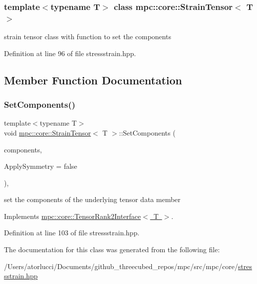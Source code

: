 \subsubsection*{template$<$typename T$>$\newline
class mpc\+::core\+::\+Strain\+Tensor$<$ T $>$}

strain tensor class with function to set the components 

Definition at line 96 of file stressstrain.\+hpp.



\subsection{Member Function Documentation}
\mbox{\label{structmpc_1_1core_1_1_strain_tensor_a9e208aa77d77296f5fc6fdadd76b018f}} 
\subsubsection{\texorpdfstring{Set\+Components()}{SetComponents()}}
{\footnotesize\ttfamily template$<$typename T$>$ \\
void \mbox{\hyperlink{structmpc_1_1core_1_1_strain_tensor}{mpc\+::core\+::\+Strain\+Tensor}}$<$ T $>$\+::Set\+Components (\begin{DoxyParamCaption}\item[{std\+::set$<$ \mbox{\hyperlink{namespacempc_1_1core_a467e1fa517a8c269b033fef3aa281360}{mpc\+::core\+::\+Tensor\+Rank2\+Component}}$<$ T $>$ $>$ \&}]{components,  }\item[{bool}]{Apply\+Symmetry = {\ttfamily false} }\end{DoxyParamCaption})\hspace{0.3cm}{\ttfamily [inline]}, {\ttfamily [virtual]}}



set the components of the underlying tensor data member 



Implements \mbox{\hyperlink{structmpc_1_1core_1_1_tensor_rank2_interface_a7d220631fe32f06ec52e5724873a00d9}{mpc\+::core\+::\+Tensor\+Rank2\+Interface$<$ T $>$}}.



Definition at line 103 of file stressstrain.\+hpp.



The documentation for this class was generated from the following file\+:\begin{DoxyCompactItemize}
\item 
/\+Users/atorlucci/\+Documents/github\+\_\+threecubed\+\_\+repos/mpc/src/mpc/core/\mbox{\hyperlink{stressstrain_8hpp}{stressstrain.\+hpp}}\end{DoxyCompactItemize}

